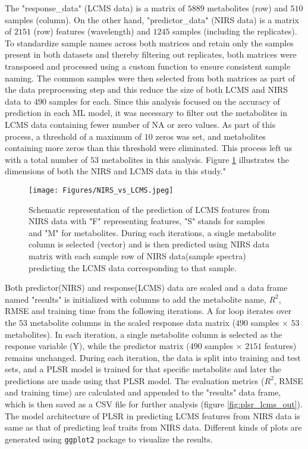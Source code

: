 \documentclass[12pt,a4paper]{report}
\begin{document}
The "response\_data" (LCMS data) is a matrix of $5889$ metabolites (row) and $510$ samples (column). On the other hand, "predictor\_data" (NIRS data) is a matrix of $2151$ (row) features (wavelength) and $1245$ samples (including the replicates). To standardize sample names across both matrices and retain only the samples present in both datasets and thereby filtering out replicates, both matrices were transposed and processed using a custom function to ensure consistent sample naming. The common samples were then selected from both matrices as part of the data preprocessing step and this reduce the size of both LCMS and NIRS data to $490$ samples for each. Since this analysis focused on the accuracy of prediction in each ML model, it was necessary to filter out the metabolites in LCMS data containing fewer number of NA or zero values. As part of this process, a threshold of a maximum of $10$ zeros was set, and metabolites containing more zeros than this threshold were eliminated. This process left us with a total number of $53$ metabolites in this analysis. Figure \ref{fig:nirs_vs_lcms} illustrates the dimensions of both the NIRS and LCMS data in this study."\\

\begin{figure}[h]
    \centering
    \texttt{[image: Figures/NIRS\_vs\_LCMS.jpeg]}
    \caption{Schematic representation of the prediction of LCMS features from NIRS data with "F" representing features, "S" stands for samples and "M" for metabolites. During each iterations, a single metabolite column is selected  (vector) and is then predicted using NIRS data matrix with each sample row of NIRS data(sample spectra) predicting the LCMS data corresponding to that sample.}
    \label{fig:nirs_vs_lcms}
\end{figure}

Both predictor(NIRS) and response(LCMS) data are scaled and a data frame named "results" is initialized with columns to add the metabolite name, $R^2$, RMSE and training time from the following iterations. A for loop iterates over the $53$ metabolite columns in the scaled response data matrix ($490$ samples × $53$ metabolites). In each iteration, a single metabolite column is selected as the response variable (Y), while the predictor matrix ($490$ samples × $2151$ features) remains unchanged. During each iteration, the data is split into training and test sets, and a PLSR model is trained for that specific metabolite and later the predictions are made using that PLSR model. The evaluation metrics ($R^2$, RMSE and training time) are calculated and appended to the "results" data frame, which is then saved as a CSV file for further analysis (figure \ref{fig:plsr_lcms_out}). The model architecture of PLSR in predicting LCMS features from NIRS data is same as that of predicting leaf traits from NIRS data. Different kinds of plots are generated using \texttt{ggplot2} package to visualize the results. \\
\end{document}
